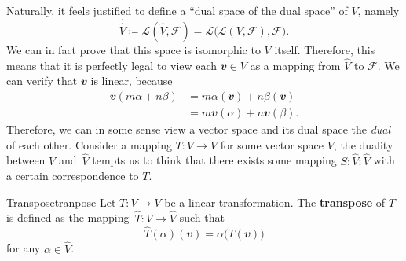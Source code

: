 \documentclass[math, code]{amznotes}
\theoremstyle{remark}
\begin{document}
Naturally, it feels justified to define a ``dual space of the dual space'' of $V$, namely 
\begin{equation*}
    \hat{\hat{V}} \coloneqq \mathcal{L}\left(\hat{V}, \mathcal{F}\right) = \mathcal{L}\bigl(\mathcal{L}(V, \mathcal{F}), \mathcal{F}\bigr).
\end{equation*}
We can in fact prove that this space is isomorphic to $V$ itself. Therefore, this means that it is perfectly legal to view each $\mathbfit{v} \in V$ as a mapping from $\hat{V}$ to $\mathcal{F}$. We can verify that $\mathbfit{v}$ is linear, because
\begin{align*}
    \mathbfit{v}(m\alpha + n\beta) & = m\alpha(\mathbfit{v}) + n\beta(\mathbfit{v}) \\
    & = m\mathbfit{v}(\alpha) + n\mathbfit{v}(\beta).
\end{align*}
Therefore, we can in some sense view a vector space and its dual space the \textit{dual} of each other. Consider a mapping $T \colon V \to V$ for some vector space $V$, the duality between $V$ and~$\hat{V}$ tempts us to think that there exists some mapping $S \colon \hat{V} \colon \hat{V}$ with a certain correspondence to $T$.
\begin{dfnbox}{Transpose}{tranpose}
    Let $T \colon V \to V$ be a linear transformation. The {\color{red} \textbf{transpose}} of $T$ is defined as the mapping~$\hat{T} \colon \hat{V} \to \hat{V}$ such that 
    \begin{equation*}
        \hat{T}(\alpha)(\mathbfit{v}) = \alpha\bigl(T(\mathbfit{v})\bigr)
    \end{equation*}
    for any $\alpha \in \hat{V}$. 
\end{dfnbox}
\end{document}
